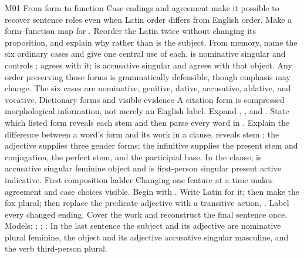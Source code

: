 
\begin{courseunit}{M01}
\SubmoduleExtension
  {From form to function}
  {Case endings and agreement make it possible to recover sentence roles even
  when Latin order differs from English order.}
  {Make a form--function map for .
  Reorder the Latin twice without changing its proposition, and explain why
   rather than  is the subject.}
  {From memory, name the six ordinary cases and give one central use of each.}
  { is nominative singular and controls ;
   agrees with it;  is accusative singular and
   agrees with that object.  Any order preserving those forms is
  grammatically defensible, though emphasis may change.  The six cases are
  nominative, genitive, dative, accusative, ablative, and vocative.}
\SubmoduleExtension
  {Dictionary forms and visible evidence}
  {A citation form is compressed morphological information, not merely an
  English label.}
  {Expand , , and
  .  State which listed form reveals each
  stem and then parse every word in .}
  {Explain the difference between a word's form and its work in a clause.}
  { reveals stem ; the adjective supplies three
  gender forms; the infinitive supplies the present stem and conjugation,
   the perfect stem, and  the participial base.  In
  the clause,  is accusative singular feminine object and
   is first-person singular present active indicative.}
\SubmoduleExtension
  {First composition ladder}
  {Changing one feature at a time makes agreement and case choices visible.}
  {Begin with .  Write Latin for it; then make the
  fox plural; then replace the predicate adjective with a transitive action,
  .  Label every changed ending.}
  {Cover the work and reconstruct the final sentence once.}
  {Models: ; ;
  .  In the last sentence the subject
  and its adjective are nominative plural feminine, the object and its
  adjective accusative singular masculine, and the verb third-person plural.}
\end{courseunit}

